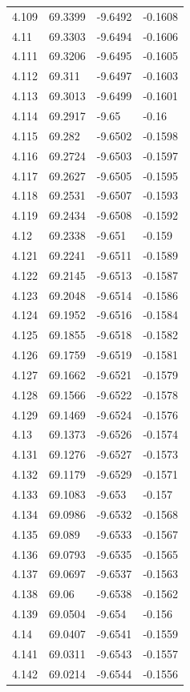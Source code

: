 \begin{tabular}{llll}
4.109 & 69.3399 & -9.6492 & -0.1608 \\
4.11 & 69.3303 & -9.6494 & -0.1606 \\
4.111 & 69.3206 & -9.6495 & -0.1605 \\
4.112 & 69.311 & -9.6497 & -0.1603 \\
4.113 & 69.3013 & -9.6499 & -0.1601 \\
4.114 & 69.2917 & -9.65 & -0.16 \\
4.115 & 69.282 & -9.6502 & -0.1598 \\
4.116 & 69.2724 & -9.6503 & -0.1597 \\
4.117 & 69.2627 & -9.6505 & -0.1595 \\
4.118 & 69.2531 & -9.6507 & -0.1593 \\
4.119 & 69.2434 & -9.6508 & -0.1592 \\
4.12 & 69.2338 & -9.651 & -0.159 \\
4.121 & 69.2241 & -9.6511 & -0.1589 \\
4.122 & 69.2145 & -9.6513 & -0.1587 \\
4.123 & 69.2048 & -9.6514 & -0.1586 \\
4.124 & 69.1952 & -9.6516 & -0.1584 \\
4.125 & 69.1855 & -9.6518 & -0.1582 \\
4.126 & 69.1759 & -9.6519 & -0.1581 \\
4.127 & 69.1662 & -9.6521 & -0.1579 \\
4.128 & 69.1566 & -9.6522 & -0.1578 \\
4.129 & 69.1469 & -9.6524 & -0.1576 \\
4.13 & 69.1373 & -9.6526 & -0.1574 \\
4.131 & 69.1276 & -9.6527 & -0.1573 \\
4.132 & 69.1179 & -9.6529 & -0.1571 \\
4.133 & 69.1083 & -9.653 & -0.157 \\
4.134 & 69.0986 & -9.6532 & -0.1568 \\
4.135 & 69.089 & -9.6533 & -0.1567 \\
4.136 & 69.0793 & -9.6535 & -0.1565 \\
4.137 & 69.0697 & -9.6537 & -0.1563 \\
4.138 & 69.06 & -9.6538 & -0.1562 \\
4.139 & 69.0504 & -9.654 & -0.156 \\
4.14 & 69.0407 & -9.6541 & -0.1559 \\
4.141 & 69.0311 & -9.6543 & -0.1557 \\
4.142 & 69.0214 & -9.6544 & -0.1556 \\

\end{tabular}
